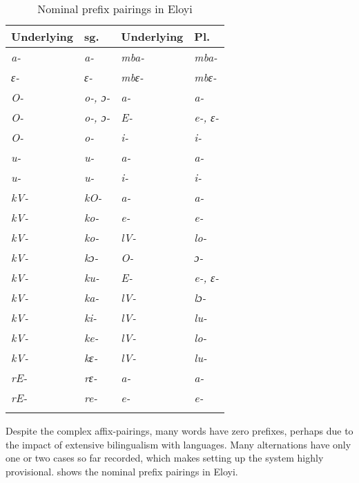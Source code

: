 \documentclass[output=paper]{langsci/langscibook}
\begin{document}
\begin{table}[t]
\caption{\label{tab:nomaffplat:23} Nominal prefix pairings in Eloyi}
\begin{tabularx}{\textwidth}{XXXl}
\lsptoprule
  Underlying 	& sg. 	&   Underlying 	& Pl. \\
\midrule
\itshape a- 	& \itshape a- 	& \itshape mba- 	& \itshape mba-\\
\itshape ɛ- 	& \itshape ɛ- 	& \itshape mbɛ- 	& \itshape mbɛ-\\
\itshape O- 	& \itshape o-, ɔ- 	& \itshape a- 	& \itshape a-\\
\itshape O- 	& \itshape o-, ɔ- 	& \itshape E- 	& \itshape e-, ɛ-\\
\itshape O- 	& \itshape o- 	& \itshape i- 	& \itshape i-\\
\itshape u- 	& \itshape u- 	& \itshape a- 	& \itshape a-\\
\itshape u- 	& \itshape u- 	& \itshape i- 	& \itshape i-\\
\itshape kV- 	& \itshape kO- 	& \itshape a- 	& \itshape a-\\
\itshape kV- 	& \itshape ko- 	& \itshape e- 	& \itshape e-\\
\itshape kV- 	& \itshape ko- 	& \itshape lV- 	& \itshape lo-\\
\itshape kV- 	& \itshape kɔ- 	& \itshape O- 	& \itshape ɔ-\\
\itshape kV- 	& \itshape ku- 	& \itshape E- 	& \itshape e-, ɛ-\\
\itshape kV- 	& \itshape ka- 	& \itshape lV- 	& \itshape lɔ-\\
\itshape kV- 	& \itshape ki- 	& \itshape lV- 	& \itshape lu-\\
\itshape kV- 	& \itshape ke- 	& \itshape lV- 	& \itshape lo-\\
\itshape kV- 	& \itshape kɛ- 	& \itshape lV- 	& \itshape lu-\\
\itshape rE- 	& \itshape rɛ- 	& {\itshape a-} 	&\itshape a- \\
\itshape rE- 	& \itshape re- 	& \itshape e- 	& \itshape e-\\
\lspbottomrule
\end{tabularx}
\end{table}

Despite the complex affix-pairings, many words have zero prefixes, perhaps due to the impact of extensive bilingualism with  languages. Many alternations have only one or two cases so far recorded, which makes setting up the system highly provisional.  shows the nominal prefix pairings in Eloyi.
\end{document}
